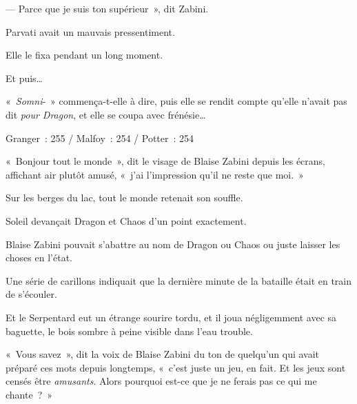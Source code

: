 --- Parce que je suis ton supérieur~», dit Zabini.

Parvati avait un mauvais pressentiment.

Elle le fixa pendant un long moment.

Et puis…

«~\emph{Somni}-~» commença-t-elle à dire, puis elle se rendit compte qu'elle n'avait pas dit \emph{pour Dragon}, et elle se coupa avec frénésie…

\later

Granger~: 255 / Malfoy~: 254 / Potter~: 254

«~Bonjour tout le monde~», dit le visage de Blaise Zabini depuis les écrans, affichant air plutôt amusé, «~j'ai l'impression qu'il ne reste que moi.~»

Sur les berges du lac, tout le monde retenait son souffle.

Soleil devançait Dragon et Chaos d'un point exactement.

Blaise Zabini pouvait s'abattre au nom de Dragon ou Chaos ou juste laisser les choses en l'état.

Une série de carillons indiquait que la dernière minute de la bataille était en train de s'écouler.

Et le Serpentard eut un étrange sourire tordu, et il joua négligemment avec sa baguette, le bois sombre à peine visible dans l'eau trouble.

«~Vous savez~», dit la voix de Blaise Zabini du ton de quelqu'un qui avait préparé ces mots depuis longtemps, «~c'est juste un jeu, en fait. Et les jeux sont censés être \emph{amusants}. Alors pourquoi est-ce que je ne ferais pas ce qui me chante~?~»
